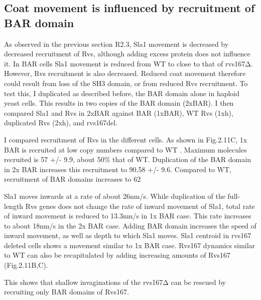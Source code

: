 	\subsection{Coat movement is influenced by recruitment of BAR domain }
As observed in the previous section R2.3, Sla1 movement is decreased by decreased recruitment of Rvs, although adding excess protein does not influence it. In BAR cells Sla1 movement is reduced from WT to close to that of rvs167Δ. However, Rvs recruitment is also decreased. Reduced coat movement therefore could result from loss of the SH3 domain, or from reduced Rvs recruitment. To test this, I duplicated as described before, the BAR domain alone in haploid yeast cells. This results in two copies of the BAR domain (2xBAR). I then compared Sla1 and Rvs  in 2xBAR against BAR (1xBAR), WT Rvs (1xh), duplicated Rvs (2xh), and rvs167del.

I compared recruitment of Rvs in the different cells. As shown in Fig.2.11C, 1x BAR is recruited at low copy numbers compared to WT . Maximum molecules recruited is 57 +/- 9.9, about 50\% that of WT. Duplication of the BAR domain in 2x BAR increases this recruitment to 90.58 +/- 9.6. Compared to WT, recruitment of BAR domains increases to 62%

Sla1 moves inwards at a rate of about 26nm/s. While duplication of the full-length Rvs genes does not change the rate of inward movement of Sla1, total rate of inward movement is reduced to 13.3nm/s in 1x BAR case. This rate increases to about 18nm/s in the 2x BAR case. Adding BAR domain increases the speed of inward movement, as well as depth to which Sla1 moves. Sla1 centroid in rvs167 deleted cells shows a movement similar to 1x BAR case. Rvs167 dynamics similar to WT can also be recapitulated by adding increasing amounts of Rvs167 (Fig.2.11B,C).

This shows that shallow invaginations of the rvs167Δ can be rescued by recruiting only BAR domains of Rvs167.


